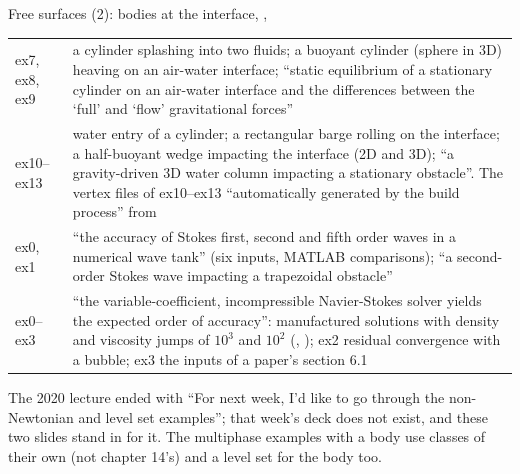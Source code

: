 \documentclass[aspectratio=169,11pt]{beamer}
\begin{document}
\begin{frame}{Free surfaces (2): bodies at the interface, , }
\label{fr:multiphase2}
\scriptsize
\setlength{\tabcolsep}{3pt}
\begin{tabular}{@{}L{0.2\textwidth}L{0.76\textwidth}@{}}
\toprule
ex7, ex8, ex9 & a cylinder splashing into two fluids; a buoyant cylinder (sphere in 3D) heaving on an air-water interface; ``static equilibrium of a stationary cylinder on an air-water interface and the differences between the `full' and `flow' gravitational forces''\\
ex10--ex13 & water entry of a cylinder; a rectangular barge rolling on the interface; a half-buoyant wedge impacting the interface (2D and 3D); ``a gravity-driven 3D water column impacting a stationary obstacle''. The vertex files of ex10--ex13 ``automatically generated by the build process'' from \\
 ex0, ex1 & ``the accuracy of Stokes first, second and fifth order waves in a numerical wave tank'' (six inputs, MATLAB comparisons); ``a second-order Stokes wave impacting a trapezoidal obstacle''\\
 ex0--ex3 & ``the variable-coefficient, incompressible Navier-Stokes solver yields the expected order of accuracy'': manufactured solutions with density and viscosity jumps of $10^3$ and $10^2$ (, ); ex2 residual convergence with a bubble; ex3 the inputs of a paper's section 6.1\\
\bottomrule
\end{tabular}
\vspace{1mm}

\scriptsize The 2020 lecture ended with ``For next week, I'd like to go through the non-Newtonian and level set examples''; that week's deck does not exist, and these two slides stand in for it. The multiphase examples with a body use  classes of their own (not chapter 14's) and a level set for the body too.
\end{frame}
\end{document}
